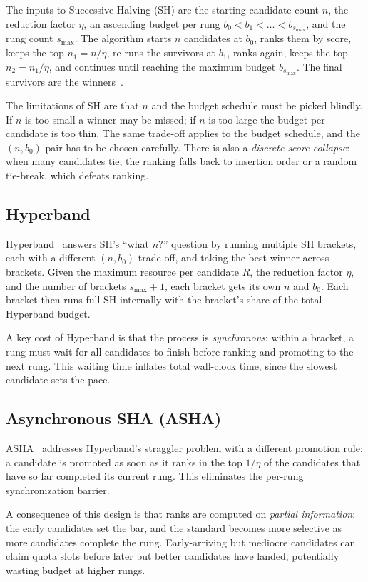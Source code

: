 The inputs to Successive Halving (SH) are the starting candidate count
$n$, the reduction factor $\eta$, an ascending budget per rung
$b_0 < b_1 < \dots < b_{s_{\max}}$, and the rung count $s_{\max}$. The
algorithm starts $n$ candidates at $b_0$, ranks them by score, keeps
the top $n_1 = n / \eta$, re-runs the survivors at $b_1$, ranks again,
keeps the top $n_2 = n_1 / \eta$, and continues until reaching the
maximum budget $b_{s_{\max}}$. The final survivors are the
winners~\cite{Jamieson:16}.

The limitations of SH are that $n$ and the budget schedule must be
picked blindly. If $n$ is too small a winner may be missed; if $n$ is
too large the budget per candidate is too thin. The same trade-off
applies to the budget schedule, and the $(n, b_0)$ pair has to be
chosen carefully. There is also a \emph{discrete-score collapse}: when
many candidates tie, the ranking falls back to insertion order or a
random tie-break, which defeats ranking.

\subsection{Hyperband}

Hyperband~\cite{Li:18} answers SH's ``what $n$?'' question by running
multiple SH brackets, each with a different $(n, b_0)$ trade-off, and
taking the best winner across brackets. Given the maximum resource per
candidate $R$, the reduction factor $\eta$, and the number of brackets
$s_{\max}+1$, each bracket gets its own $n$ and $b_0$. Each bracket
then runs full SH internally with the bracket's share of the total
Hyperband budget.

A key cost of Hyperband is that the process is \emph{synchronous}:
within a bracket, a rung must wait for all candidates to finish before
ranking and promoting to the next rung. This waiting time inflates
total wall-clock time, since the slowest candidate sets the pace.

\subsection{Asynchronous SHA (ASHA)}

ASHA~\cite{Li:20} addresses Hyperband's straggler problem with a
different promotion rule: a candidate is promoted as soon as it ranks
in the top $1/\eta$ of the candidates that have so far completed its
current rung. This eliminates the per-rung synchronization barrier.

A consequence of this design is that ranks are computed on
\emph{partial information}: the early candidates set the bar, and the
standard becomes more selective as more candidates complete the rung.
Early-arriving but mediocre candidates can claim quota slots before
later but better candidates have landed, potentially wasting budget at
higher rungs.

